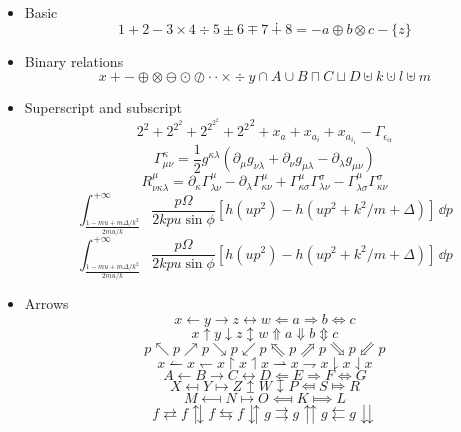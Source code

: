 \documentclass[11pt]{article}
\begin{document}
\begin{itemize}
  \item Basic
        \[ 1 + 2 - 3 \times 4 \div 5 \pm 6 \mp 7 \dotplus 8 = -a \oplus b \otimes c -\{z\}\]

  \item Binary relations
        \[
          x + - \oplus \otimes \ominus \odot \oslash \cdot \cdotp \times \div
          y \cap A \cup B \sqcap C \sqcup D \cupleftarrow k \cupdot l \uplus m
        \]

  \item Superscript and subscript
        \[ 2^2 + 2^{2^2} + 2^{2^{2^2}} + {2^2}^2 + x_a + x_{a_i} + x_{a_{i_1}}-\Gamma_{\epsilon_\alpha} \]
        \[\Gamma_{\mu\nu}^{\kappa}=\frac{1}{2}g^{\kappa\lambda}(\partial_\mu g_{\nu\lambda}+\partial_\nu g_{\mu\lambda}-\partial_\lambda g_{\mu\nu})\]
        \[R_{\nu\kappa\lambda}^\mu=\partial_\kappa\Gamma_{\lambda\nu}^\mu-\partial_\lambda\Gamma_{\kappa\nu}^\mu+\Gamma_{\kappa\sigma}^\mu\Gamma_{\lambda\nu}^\sigma-\Gamma_{\lambda\sigma}^\mu\Gamma_{\kappa\nu}^\sigma\]
        \[\int_{\frac{1-m u+m\Delta/k^2}{2mu/k}}^{+\infty}\frac{p\Omega}{2 k p u \sin\phi} [h(up^2)-h(up^2+k^2/m+\Delta)]\,\dd p\]
        \[\int_{\frac{1-m u+m\Delta/k^2}{2mu/k}}^{+\infty}\frac{p\Omega}{2 k p u \sin\phi} [h(up^2)-h(up^2+k^2/m+\Delta)]\,\dd p\]
  \item Arrows
        \[
          x \leftarrow y \rightarrow z \leftrightarrow w
            \Leftarrow a \Rightarrow b \Leftrightarrow c
        \]
        \[
          x \uparrow   y \downarrow  z \updownarrow    w
            \Uparrow   a \Downarrow  b \Updownarrow    c
        \]
        \[
          p \nwarrow p \nearrow p \searrow p \swarrow p
            \Nwarrow p \Nearrow p \Searrow p \Swarrow p
        \]
        \[
          x \leftharpoonup    x \leftharpoondown  x
            \upharpoonright   x \upharpoonleft    x
            \rightharpoonup   x \rightharpoondown x
            \downharpoonright x \downharpoonleft  x
        \]
        \[
          A \longleftarrow B \longrightarrow C \longleftrightarrow D
            \Longleftarrow E \Longrightarrow F \Longleftrightarrow G
        \]
        \[
          X \mapsfrom Y \mapsto Z \mapsup W \mapsdown P \Mapsfrom S \Mapsto R
        \]
        \[
          M \longmapsfrom N \longmapsto O \Longmapsfrom K \Longmapsto L
        \]
        \[
          f \rightleftarrows  f \updownarrows f \leftrightarrows f \downuparrows
          g \rightrightarrows g \upuparrows   g \leftleftarrows  g \downdownarrows
\]
\end{itemize}
\end{document}
